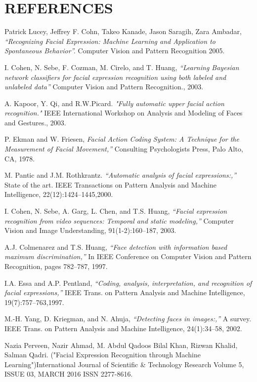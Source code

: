 \documentclass[a4paper,12pt,oneside]{article}
\begin{document}
\section{REFERENCES}
\begin{thebibliography}{9}


 Patrick Lucey, Jeffrey F. Cohn, Takeo Kanade, Jason
Saragih, Zara Ambadar, \emph{“Recognizing Facial
Expression: Machine Learning and Application to
Spontaneous Behavior”. }Computer Vision and Pattern
Recognition 2005.

 I. Cohen, N. Sebe, F. Cozman, M. Cirelo, and T.
Huang, \emph{“Learning Bayesian network classifiers for facial
expression recognition using both labeled and unlabeled
data” }Computer Vision and Pattern Recognition., 2003.

A. Kapoor, Y. Qi, and R.W.Picard. \emph{"Fully automatic
upper facial action recognition."} IEEE International
Workshop on Analysis and Modeling of Faces and
Gestures., 2003.

 P. Ekman and W. Friesen,\emph{ Facial Action Coding
System: A Technique for the Measurement of Facial
Movement,”} Consulting Psychologists Press, Palo Alto,
CA, 1978.

 M. Pantic and J.M. Rothkrantz. \emph{“Automatic analysis
of facial expressions:,”} State of the art. IEEE Transactions
on Pattern Analysis and Machine Intelligence,
22(12):1424–1445,2000.

 I. Cohen, N. Sebe, A. Garg, L. Chen, and T.S. Huang, \emph{“Facial expression recognition from video sequences:
Temporal and static modeling,”} Computer Vision and
Image Understanding, 91(1-2):160–187, 2003.

A.J. Colmenarez and T.S. Huang, \emph{“Face detection with
information based maximum discrimination,” }In IEEE
Conference on Computer Vision and Pattern
Recognition, pages 782–787, 1997.

 I.A. Essa and A.P. Pentland, \emph{“Coding, analysis,
interpretation, and recognition of facial expressions,”} IEEE Trans. on Pattern Analysis and Machine
Intelligence, 19(7):757–763,1997.

M.-H. Yang, D. Kriegman, and N. Ahuja,\emph{ “Detecting
faces in images:,”} A survey. IEEE Trans. on Pattern
Analysis and Machine Intelligence, 24(1):34–58, 2002.

Nazia Perveen, Nazir Ahmad, M. Abdul Qadoos
Bilal Khan, Rizwan Khalid, Salman Qadri. ("Facial
Expression Recognition through Machine Learning")International Journal of Scientific \& Technology
Research Volume 5, ISSUE 03, MARCH 2016 ISSN
2277-8616.


\end{thebibliography}
\end{document}
